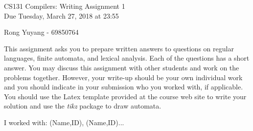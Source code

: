 \documentclass[10pt]{article}
\begin{document}
\begin{center}
\Large CS131 Compilers: Writing Assignment 1\\Due Tuesday, March 27, 2018 at 23:55
\end{center}

\begin{center}
\LARGE Rong Yuyang - 69850764
\end{center}


This assignment asks you to prepare written answers to questions on
regular languages, finite automata, and lexical analysis.  Each of the
questions has a short answer.  You may discuss this assignment with
other students and work on the problems together.  However, your
write-up should be your own individual work and you should indicate in your submission who you worked
with, if applicable. You should use the Latex template provided at the course web site to write your solution and use the \emph{tikz} package to draw
automata.

\begin{center}
I worked with: (Name,ID), (Name,ID)...
\end{center}
\end{document}

